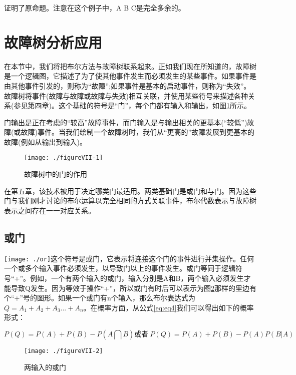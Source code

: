 \documentclass[cn,11pt,chinese]{elegantbook}
\begin{document}
{证明了原命题。注意在这个例子中，A B C是完全多余的。

\section{故障树分析应用}

在本节中，我们将把布尔方法与故障树联系起来。正如我们现在所知道的，故障树是一个逻辑图，它描述了为了使其他事件发生而必须发生的某些事件。如果事件是由其他事件引发的，则称为“故障”;如果事件是基本的启动事件，则称为“失效”。故障树将事件(故障与故障或故障与失效)相互关联，并使用某些符号来描述各种关系(参见第四章)。这个基础的符号是“门”，每个门都有输入和输出，如图\ref{fig7-1}所示。

门输出是正在考虑的“较高”故障事件，而门输入是与输出相关的更基本(“较低”)故障(或故障)事件。当我们绘制一个故障树时，我们从“更高的”故障发展到更基本的故障(例如从输出到输入)。

\begin{figure}
	\texttt{[image: ./figureVII-1]}
	\caption{故障树中的门的作用}
	\label{fig7-1}
\end{figure}


在第五章，该技术被用于决定哪类门最适用。两类基础门是或门和与门。因为这些门与我们刚才讨论的布尔运算以完全相同的方式关联事件，布尔代数表示与故障树表示之间存在一一对应关系。

\subsection{或门}

\texttt{[image: ./or]}这个符号是或门，它表示将连接这个门的事件进行并集操作。任何一个或多个输入事件必须发生，以导致门以上的事件发生。或门等同于逻辑符号“+”。例如，一个有两个输入的或门，输入分别是A和B，两个输入必须发生才能导致Q发生。因为等效于操作“+”，所以或门有时后可以表示为图\ref{fig7-2}那样的里边有个“+”号的图形。如果一个或门有n个输入，那么布尔表达式为$Q=A_1+A_2+A_3...+A_n$。在概率方面，从公式\ref{eq:eq4}我们可以得出如下的概率形式：

\begin{equation}\label{eq7-1}
P(Q)=P(A)+P(B)-P(A\bigcap B)\mbox{或者}\ P(Q)=P(A)+P(B)-P(A)P(B|A) 
\end{equation}

\begin{figure}
	\texttt{[image: ./figureVII-2]}
	\caption{两输入的或门}
	\label{fig7-2}
\end{figure}

}
\end{document}
